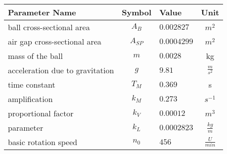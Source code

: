 \begin{tabular}{lclc}
\hline
 Parameter Name                  &  Symbol  & Value       &      Unit       \\
\hline
 ball cross-sectional area       & $A_{B}$  & $0.002827$  &      $m^2$      \\
 air gap cross-sectional area    & $A_{SP}$ & $0.0004299$ &      $m^2$      \\
 mass of the ball                &   $m$    & $0.0028$    &       kg        \\
 acceleration due to gravitation &   $g$    & $9.81$      & $\frac{m}{s^2}$ \\
 time constant                   & $T_{M}$  & $0.369$     &        s        \\
 amplification                   & $k_{M}$  & $0.273$     &    $s^{-1}$     \\
 proportional factor             & $k_{V}$  & $0.00012$   &      $m^3$      \\
 parameter                       & $k_{L}$  & $0.0002823$ & $\frac{kg}{m}$  \\
 basic rotation speed            & $n_{0}$  & $456$       & $\frac{U}{min}$ \\
\hline
\end{tabular}